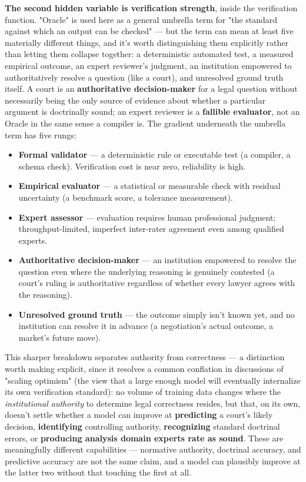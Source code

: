 \textbf{The second hidden variable is verification strength}, inside the verification function. "Oracle" is used here as a general umbrella term for "the standard against which an output can be checked" --- but the term can mean at least five materially different things, and it's worth distinguishing them explicitly rather than letting them collapse together: a deterministic automated test, a measured empirical outcome, an expert reviewer's judgment, an institution empowered to authoritatively resolve a question (like a court), and unresolved ground truth itself. A court is an \textbf{authoritative decision-maker} for a legal question without necessarily being the only source of evidence about whether a particular argument is doctrinally sound; an expert reviewer is a \textbf{fallible evaluator}, not an Oracle in the same sense a compiler is. The gradient underneath the umbrella term has five rungs:

\begin{itemize}
\item \textbf{Formal validator} --- a deterministic rule or executable test (a compiler, a schema check). Verification cost is near zero, reliability is high.
\item \textbf{Empirical evaluator} --- a statistical or measurable check with residual uncertainty (a benchmark score, a tolerance measurement).
\item \textbf{Expert assessor} --- evaluation requires human professional judgment; throughput-limited, imperfect inter-rater agreement even among qualified experts.
\item \textbf{Authoritative decision-maker} --- an institution empowered to resolve the question even where the underlying reasoning is genuinely contested (a court's ruling is authoritative regardless of whether every lawyer agrees with the reasoning).
\item \textbf{Unresolved ground truth} --- the outcome simply isn't known yet, and no institution can resolve it in advance (a negotiation's actual outcome, a market's future move).
\end{itemize}

This sharper breakdown separates authority from correctness --- a distinction worth making explicit, since it resolves a common conflation in discussions of "scaling optimism" (the view that a large enough model will eventually internalize its own verification standard): no volume of training data changes where the \emph{institutional authority} to determine legal correctness resides, but that, on its own, doesn't settle whether a model can improve at \textbf{predicting} a court's likely decision, \textbf{identifying} controlling authority, \textbf{recognizing} standard doctrinal errors, or \textbf{producing analysis domain experts rate as sound}. These are meaningfully different capabilities --- normative authority, doctrinal accuracy, and predictive accuracy are not the same claim, and a model can plausibly improve at the latter two without that touching the first at all.


